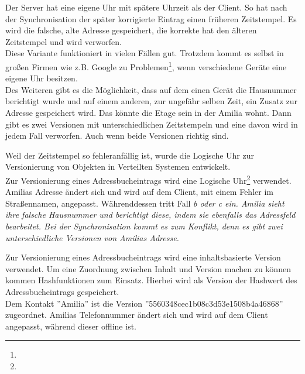 \begin{description}[leftmargin=0.5cm,style=nextline]
    Der Server hat eine eigene Uhr mit spätere Uhrzeit als der Client.
    So hat nach der Synchronisation der später korrigierte Eintrag einen früheren Zeitstempel.
    Es wird die falsche, alte Adresse gespeichert, die korrekte hat den älteren Zeitstempel und wird verworfen.\\
    Diese Variante funktioniert in vielen Fällen gut. Trotzdem kommt es selbst in großen Firmen wie z.B. Google zu Problemen\footnote{\google}, wenn verschiedene Geräte eine eigene Uhr besitzen.\\
    Des Weiteren gibt es die Möglichkeit, dass auf dem einen Gerät die Hausnummer berichtigt wurde und auf einem anderen, zur ungefähr selben Zeit, ein Zusatz zur Adresse gespeichert wird. Das könnte die Etage sein in der Amilia wohnt. Dann gibt es zwei Versionen mit unterschiedlichen Zeitstempeln und eine davon wird in jedem Fall verworfen. Auch wenn beide Versionen richtig sind.\\
  \item[Methode V2 -- Logische Uhr:]
    Weil der Zeitstempel so fehleranfällig ist, wurde die Logische Uhr zur Versionierung von Objekten in Verteilten Systemen entwickelt.\\
    Zur Versionierung eines Adressbucheintrags wird eine Logische Uhr\footnote{\logicalclock} verwendet.
    Amilias Adresse ändert sich und wird auf dem Client, mit einem Fehler im Straßennamen, angepasst.
    Währenddessen tritt Fall \it{b} oder \it{c} ein.
    Amilia sieht ihre falsche Hausnummer und berichtigt diese, indem sie ebenfalls das Adressfeld bearbeitet.
    Bei der Synchronisation kommt es zum Konflikt, denn es gibt zwei unterschiedliche Versionen von Amilias Adresse.\\
  \item[Methode V3 -- Inhaltsbasierte Version:]%
    Zur Versionierung eines Adressbucheintrags wird eine inhaltsbasierte Version verwendet. Um eine Zuordnung zwischen Inhalt und Version machen zu können kommen \Gls{Hash}funktionen zum Einsatz. Hierbei wird als Version der Hashwert des Adressbucheintrags gespeichert.\\
    Dem Kontakt ''Amilia'' ist die Version ''5560348cec1b08c3d53e1508b4a46868'' zugeordnet. Amilias Telefonnummer ändert sich und wird auf dem Client angepasst, während dieser offline ist.

\end{description}
